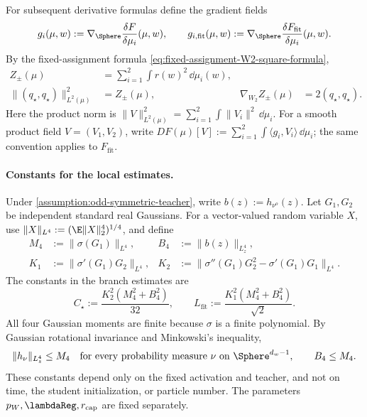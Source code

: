 For subsequent derivative formulas define the gradient fields
\begin{equation}
\label{eq:mf-branch-radial-notation}
 g_i(\mu,w):=\nabla_\Sphere\frac{\delta F}{\delta\mu_i}(\mu,w),
 \qquad
 g_{i,\mathrm{fit}}(\mu,w):=\nabla_\Sphere
                  \frac{\delta F_{\mathrm{fit}}}{\delta\mu_i}(\mu,w).
\end{equation}
By the fixed-assignment formula \cref{eq:fixed-assignment-W2-square-formula},
\begin{equation}
\label{eq:mf-branch-distance-gradient}
\begin{aligned}
 Z_\pm(\mu)&=\sum_{i=1}^2\int r(w)^2\,\dd\mu_i(w),\\
 \|(q_\star,q_\star)\|_{L^2(\mu)}^2&=Z_\pm(\mu),
 &\nabla_{W_2}Z_\pm(\mu)&=2(q_\star,q_\star).
\end{aligned}
\end{equation}
Here the product norm is
\(\|V\|_{L^2(\mu)}^2=\sum_{i=1}^2\int\|V_i\|^2\,\dd\mu_i\).
For a smooth product field \(V=(V_1,V_2)\), write
\(DF(\mu)[V]:=\sum_{i=1}^2\int\langle g_i,V_i\rangle\,\dd\mu_i\);
the same convention applies to \(F_{\mathrm{fit}}\).

\paragraph{Constants for the local estimates.}
Under \cref{assumption:odd-symmetric-teacher}, write
\(b(z):=h_{\nu^o}(z)\). Let \(G_1,G_2\) be independent standard real
Gaussians. For a vector-valued random variable \(X\), use
\(\|X\|_{L^4}:=(\E\|X\|_2^4)^{1/4}\), and define
\begin{equation}
\label{eq:mf-gaussian-derivative-constants}
\begin{aligned}
 M_4&:=\|\sigma(G_1)\|_{L^4},
 &B_4&:=\|b(z)\|_{L^4_z},\\
 K_1&:=\|\sigma'(G_1)G_2\|_{L^4},
 &K_2&:=\|\sigma''(G_1)G_2^2-\sigma'(G_1)G_1\|_{L^4}.
\end{aligned}
\end{equation}
The constants in the branch estimates are
\begin{equation}
\label{eq:mf-branch-estimate-constants}
 C_\star:=\frac{K_2^2(M_4^2+B_4^2)}{32},
 \qquad
 L_{\mathrm{fit}}:=\frac{K_1^2(M_4^2+B_4^2)}{\sqrt{2}}.
\end{equation}
All four Gaussian moments are finite because \(\sigma\) is a finite
polynomial. By Gaussian rotational invariance and Minkowski's inequality,
\begin{equation}
\label{eq:mf-output-fourth-moment-bound}
 \|h_\nu\|_{L^4_z}\le M_4
 \quad\text{for every probability measure \(\nu\) on \(\Sphere^{d_w-1}\)},
 \qquad B_4\le M_4.
\end{equation}
These constants depend only on the fixed activation and teacher, and not on
time, the student initialization, or particle number. The parameters
\(p_W,\lambdaReg,r_{\mathrm{cap}}\) are fixed separately.

